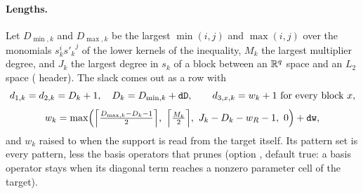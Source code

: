 \paragraph{Lengths.} Let $D_{\min,k}$ and $D_{\max,k}$ be the largest $\min(i,j)$ and $\max(i,j)$ over the monomials $s_k^i{s'_k}^j$ of the lower kernels of the inequality, $M_k$ the largest multiplier degree, and $J_k$ the largest degree in $s_k$ of a block between an $\mathbb{R}^q$ space and an $L_2$ space ( header). The slack comes out as a row with
\[
d_{1,k}=d_{2,k}=D_k+1,\quad D_k=D_{\min,k}+\texttt{dD},\qquad d_{3,x,k}=w_k+1\ \text{for every block } x,
\]
\[
w_k=\max\Bigl(\Bigl\lceil\tfrac{D_{\max,k}-D_k-1}{2}\Bigr\rceil,\ \Bigl\lceil\tfrac{M_k}{2}\Bigr\rceil,\ J_k-D_k-w_R-1,\ 0\Bigr)+\code{dw},
\]
and $w_k$ raised to  when the support is read from the target itself. Its pattern set is every pattern, less the basis operators that  prunes (option , default true: a basis operator stays when its diagonal term reaches a nonzero parameter cell of the target).
